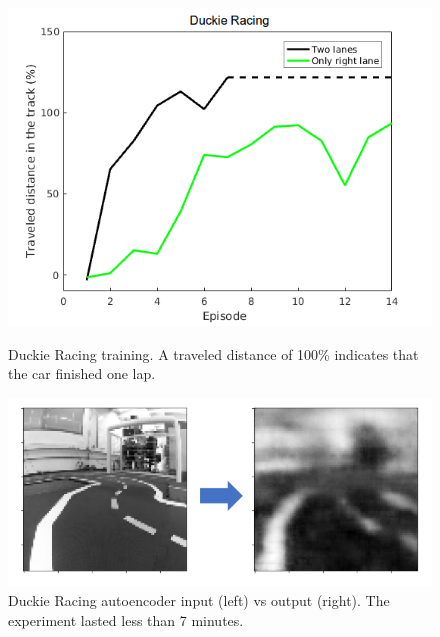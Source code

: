 \begin{figure}[h]
    \centering
    \begin{minipage}{.5\textwidth}
    \vspace{-0.2cm}
    \includegraphics[width=1.0\linewidth]{imagenes/cap3/racing_duckie_results.png}
    \vspace{-0.2cm}
    \caption[Duckie Racing training.]{Duckie Racing training. A traveled distance of 100\% indicates that the car finished one lap.}
    \label{fig:racing_duckie_results}
    \end{minipage}%
    \begin{minipage}{.5\textwidth}
    \centering
    \includegraphics[width=1.0\linewidth]{imagenes/cap3/AE_duckie2.png}
    \vspace{-0.2cm}
    \caption[Duckie Racing autoencoder input vs output.]{Duckie Racing autoencoder input (left) vs output (right). The experiment lasted less than 7 minutes.}
    \label{fig:AE_duckie}
    \end{minipage}
\end{figure}

